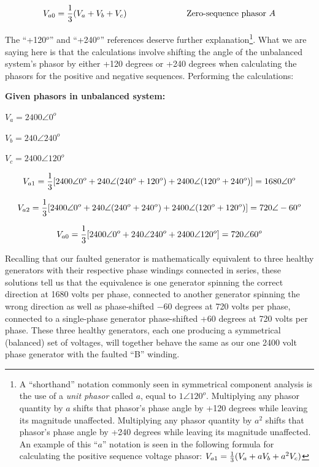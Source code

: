 $$V_{a0} = {1 \over 3} (V_a + V_b + V_c) \hskip 70pt \hbox{Zero-sequence phasor } A$$

The ``+120$^{o}$'' and ``+240$^{o}$'' references deserve further explanation\footnote{A ``shorthand'' notation commonly seen in symmetrical component analysis is the use of a \textit{unit phasor} called $a$, equal to $1 \angle 120^o$.  Multiplying any phasor quantity by $a$ shifts that phasor's phase angle by +120 degrees while leaving its magnitude unaffected.  Multiplying any phasor quantity by $a^2$ shifts that phasor's phase angle by +240 degrees while leaving its magnitude unaffected.  An example of this ``$a$'' notation is seen in the following formula for calculating the positive sequence voltage phasor: $V_{a1} = {1 \over 3} (V_a + a V_b + a^2 V_c)$}.  What we are saying here is that the calculations involve shifting the angle of the unbalanced system's phasor by either +120 degrees or +240 degrees when calculating the phasors for the positive and negative sequences.  Performing the calculations:

\vskip 10pt

\textbf{Given phasors in unbalanced system:}

$V_a = 2400 \angle 0^o$

$V_b = 240 \angle 240^o$

$V_c = 2400 \angle 120^o$

\vskip 10pt

$$V_{a1} = {1 \over 3} [2400 \angle 0^o + 240 \angle (240^o + 120^o) + 2400 \angle (120^o + 240^o)] = 1680 \angle 0^o$$

$$V_{a2} = {1 \over 3} [2400 \angle 0^o + 240 \angle (240^o + 240^o) + 2400 \angle (120^o + 120^o)] = 720 \angle -60^o$$

$$V_{a0} = {1 \over 3} [2400 \angle 0^o + 240 \angle 240^o + 2400 \angle 120^o] = 720 \angle 60^o$$

Recalling that our faulted generator is mathematically equivalent to three healthy generators with their respective phase windings connected in series, these solutions tell us that the equivalence is one generator spinning the correct direction at 1680 volts per phase, connected to another generator spinning the wrong direction as well as phase-shifted $-60$ degrees at 720 volts per phase, connected to a single-phase generator phase-shifted +60 degrees at 720 volts per phase.  These three healthy generators, each one producing a symmetrical (balanced) set of voltages, will together behave the same as our one 2400 volt phase generator with the faulted ``B'' winding.

